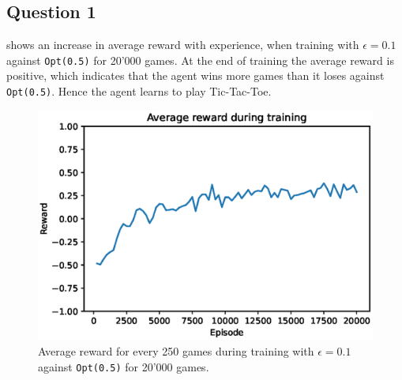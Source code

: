 \documentclass[10pt]{IEEEtran}
\begin{document}
\subsection*{Question 1}
 shows an increase in average reward with experience, when training with $\epsilon = 0.1$ against \texttt{Opt(0.5)} for 20'000 games. At the end of training the average reward is positive, which indicates that the agent wins more games than it loses against \texttt{Opt(0.5)}. Hence the agent learns to play Tic-Tac-Toe. 
\begin{figure}[H]
    \centering
    \includegraphics[width = 0.85\linewidth]{code/figures/rewards_Q1.eps}
    \caption{Average reward for every 250 games during training with $\epsilon = 0.1$ against \texttt{Opt(0.5)} for 20'000 games.}
    \label{plot_question1}
\end{figure}
\end{document}
